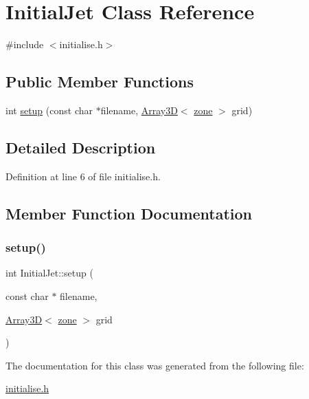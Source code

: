 \hypertarget{classInitialJet}{}\section{Initial\+Jet Class Reference}
\label{classInitialJet}


{\ttfamily \#include $<$initialise.\+h$>$}

\subsection*{Public Member Functions}
\begin{DoxyCompactItemize}
\item 
int \hyperlink{classInitialJet_a05c91c03f87ee207fe2bd9d52a9f27f8}{setup} (const char $\ast$filename, \hyperlink{classTNT_1_1Array3D}{Array3D}$<$ \hyperlink{structzone}{zone} $>$ grid)
\end{DoxyCompactItemize}


\subsection{Detailed Description}


Definition at line 6 of file initialise.\+h.



\subsection{Member Function Documentation}
\mbox{\label{classInitialJet_a05c91c03f87ee207fe2bd9d52a9f27f8}} 
\subsubsection{\texorpdfstring{setup()}{setup()}}
{\footnotesize\ttfamily int Initial\+Jet\+::setup (\begin{DoxyParamCaption}\item[{const char $\ast$}]{filename,  }\item[{\hyperlink{classTNT_1_1Array3D}{Array3D}$<$ \hyperlink{structzone}{zone} $>$}]{grid }\end{DoxyParamCaption})}



The documentation for this class was generated from the following file\+:\begin{DoxyCompactItemize}
\item 
\hyperlink{initialise_8h}{initialise.\+h}\end{DoxyCompactItemize}
